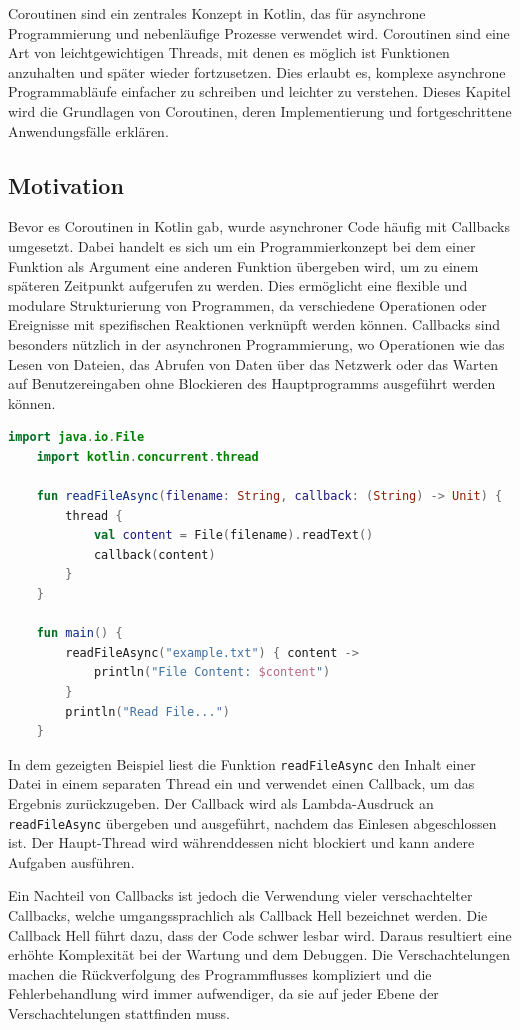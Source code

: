 \documentclass[fontsize=12pt,paper=a4,twoside=semi,parskip=half-,headsepline,headinclude]{scrreprt}
\begin{document}
Coroutinen sind ein zentrales Konzept in Kotlin, das für asynchrone Programmierung und nebenläufige Prozesse verwendet wird. Coroutinen sind eine Art von leichtgewichtigen Threads, mit denen es möglich ist Funktionen anzuhalten und später wieder fortzusetzen. Dies erlaubt es, komplexe asynchrone Programmabläufe einfacher zu schreiben und leichter zu verstehen. Dieses Kapitel wird die Grundlagen von Coroutinen, deren Implementierung und fortgeschrittene Anwendungsfälle erklären.

\subsection{Motivation}

Bevor es Coroutinen in Kotlin gab, wurde asynchroner Code häufig mit Callbacks umgesetzt. Dabei handelt es sich um ein Programmierkonzept bei dem einer Funktion als Argument eine anderen Funktion übergeben wird, um zu einem späteren Zeitpunkt aufgerufen zu werden. Dies ermöglicht eine flexible und modulare Strukturierung von Programmen, da verschiedene Operationen oder Ereignisse mit spezifischen Reaktionen verknüpft werden können. Callbacks sind besonders nützlich in der asynchronen Programmierung, wo Operationen wie das Lesen von Dateien, das Abrufen von Daten über das Netzwerk oder das Warten auf Benutzereingaben ohne Blockieren des Hauptprogramms ausgeführt werden können.

\begin{lstlisting}[language=Kotlin]
	import java.io.File
	import kotlin.concurrent.thread
	
	fun readFileAsync(filename: String, callback: (String) -> Unit) {
		thread {
			val content = File(filename).readText()
			callback(content)
		}
	}
	
	fun main() {
		readFileAsync("example.txt") { content ->
			println("File Content: $content")
		}
		println("Read File...")
	}
\end{lstlisting}

In dem gezeigten Beispiel liest die Funktion \texttt{readFileAsync} den Inhalt einer Datei in einem separaten Thread ein und verwendet einen Callback, um das Ergebnis zurückzugeben. Der Callback wird als Lambda-Ausdruck an \texttt{readFileAsync} übergeben und ausgeführt, nachdem das Einlesen abgeschlossen ist. Der Haupt-Thread wird währenddessen nicht blockiert und kann andere Aufgaben ausführen.

Ein Nachteil von Callbacks ist jedoch die Verwendung vieler verschachtelter Callbacks, welche umgangssprachlich als Callback Hell bezeichnet werden\cite{Leger2021}. Die Callback Hell führt dazu, dass der Code schwer lesbar wird. Daraus resultiert eine erhöhte Komplexität bei der Wartung und dem Debuggen. Die Verschachtelungen machen die Rückverfolgung des Programmflusses kompliziert und  die Fehlerbehandlung wird immer aufwendiger, da sie auf jeder Ebene der Verschachtelungen stattfinden muss.
\end{document}
